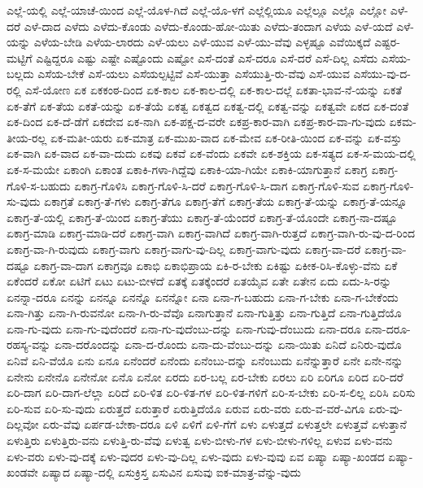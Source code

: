 {ಎಲ್ಲೆ-ಯಲ್ಲಿ
ಎಲ್ಲೆ-ಯಾಚೆ-ಯಿಂದ
ಎಲ್ಲೆ-ಯೊಳ-ಗಿದೆ
ಎಲ್ಲೆ-ಯೊ-ಳಗೆ
ಎಲ್ಲೆಲ್ಲಿಯೂ
ಎಲ್ಲೆಲ್ಲೂ
ಎಲ್ಲೊ
ಎಲ್ಲೋ
ಎಳೆ-ದರೆ
ಎಳೆ-ದಾದ
ಎಳೆದು
ಎಳೆದು-ಕೊಂಡು
ಎಳೆದು-ಕೊಂಡು-ಹೋ-ಯಿತು
ಎಳೆದು-ತಂದಾಗ
ಎಳೆಯ
ಎಳೆ-ಯದೆ
ಎಳೆ-ಯನ್ನು
ಎಳೆಯ-ಬೇಡಿ
ಎಳೆಯ-ಲಾರದು
ಎಳೆ-ಯಲು
ಎಳೆ-ಯುವ
ಎಳೆ-ಯು-ವೆವು
ಎಳ್ಳಷ್ಟೂ
ಎವೆಯಿಕ್ಕದೆ
ಎಷ್ಟರ-ಮಟ್ಟಿಗೆ
ಎಷ್ಟಿದ್ದರೂ
ಎಷ್ಟು
ಎಷ್ಟೇ
ಎಷ್ಟೊಂದು
ಎಷ್ಟೋ
ಎಸೆ-ದಂತೆ
ಎಸೆ-ದರೂ
ಎಸೆ-ದರೆ
ಎಸೆ-ದಿಲ್ಲ
ಎಸೆದು
ಎಸೆಯ-ಬಲ್ಲದು
ಎಸೆಯ-ಬೇಕೆ
ಎಸೆ-ಯಲು
ಎಸೆಯಲ್ಪಟ್ಟಿವೆ
ಎಸೆ-ಯುತ್ತಾ
ಎಸೆಯುತ್ತಿ-ರು-ವೆವು
ಎಸೆ-ಯುವ
ಎಸೆಯು-ವು-ದ-ರಲ್ಲಿ
ಎಸೆ-ಯೋಣ
ಏಕ
ಏಕಕಂಠ-ದಿಂದ
ಏಕ-ಕಾಲ
ಏಕ-ಕಾಲ-ದಲ್ಲಿ
ಏಕ-ಕಾಲ-ದಲ್ಲೆ
ಏಕತಾ-ಭಾವ-ನೆ-ಯನ್ನು
ಏಕತೆ
ಏಕ-ತೆಗೆ
ಏಕ-ತೆಯ
ಏಕತೆ-ಯನ್ನು
ಏಕ-ತೆಯೆ
ಏಕತ್ವ
ಏಕತ್ವದ
ಏಕತ್ವ-ದಲ್ಲಿ
ಏಕತ್ವ-ವನ್ನು
ಏಕತ್ವವೇ
ಏಕದ
ಏಕ-ದಂತೆ
ಏಕ-ದಿಂದ
ಏಕ-ದೆ-ಡೆಗೆ
ಏಕದೇವ
ಏಕ-ನಾಗಿ
ಏಕ-ಪಕ್ಷ-ದ-ವರೇ
ಏಕಪ್ರ-ಕಾರ-ವಾಗಿ
ಏಕಪ್ರ-ಕಾರ-ವಾ-ಗು-ವುದು
ಏಕಮ-ತೀಯ-ರಲ್ಲ
ಏಕ-ಮತೀ-ಯರು
ಏಕ-ಮಾತ್ರ
ಏಕ-ಮುಖ-ವಾದ
ಏಕ-ಮೇವ
ಏಕ-ರೀತಿ-ಯಿಂದ
ಏಕ-ವನ್ನು
ಏಕ-ವಸ್ತು
ಏಕ-ವಾಗಿ
ಏಕ-ವಾದ
ಏಕ-ವಾ-ದುದು
ಏಕವು
ಏಕವೆ
ಏಕ-ವೆಂದು
ಏಕವೇ
ಏಕ-ಶಕ್ತಿಯ
ಏಕ-ಸತ್ಯದ
ಏಕ-ಸ-ಮಯ-ದಲ್ಲಿ
ಏಕ-ಸ-ಮಯೇ
ಏಕಾಂಗಿ
ಏಕಾಂತ
ಏಕಾಕಿ-ಗಳಾ-ಗಿದ್ದೆವು
ಏಕಾಕಿ-ಯಾ-ಗಿಯೇ
ಏಕಾಕಿ-ಯಾಗುತ್ತಾನೆ
ಏಕಾಗ್ರ
ಏಕಾಗ್ರ-ಗೊಳಿ-ಸ-ಬಹುದು
ಏಕಾಗ್ರ-ಗೊಳಿಸಿ
ಏಕಾಗ್ರ-ಗೊಳಿ-ಸಿ-ದರೆ
ಏಕಾಗ್ರ-ಗೊಳಿ-ಸಿ-ದಾಗ
ಏಕಾಗ್ರ-ಗೊಳಿ-ಸುವ
ಏಕಾಗ್ರ-ಗೊಳಿ-ಸು-ವುದು
ಏಕಾಗ್ರತೆ
ಏಕಾಗ್ರ-ತೆ-ಗಳು
ಏಕಾಗ್ರ-ತೆಗೂ
ಏಕಾಗ್ರ-ತೆಗೆ
ಏಕಾಗ್ರ-ತೆಯ
ಏಕಾಗ್ರ-ತೆ-ಯನ್ನು
ಏಕಾಗ್ರ-ತೆ-ಯನ್ನೂ
ಏಕಾಗ್ರ-ತೆ-ಯಲ್ಲಿ
ಏಕಾಗ್ರ-ತೆ-ಯಿಂದ
ಏಕಾಗ್ರ-ತೆಯು
ಏಕಾಗ್ರ-ತೆ-ಯೆಂದರೆ
ಏಕಾಗ್ರ-ತೆ-ಯೊಂದೇ
ಏಕಾಗ್ರ-ನಾ-ದಷ್ಟೂ
ಏಕಾಗ್ರ-ಮಾಡಿ
ಏಕಾಗ್ರ-ಮಾಡಿ-ದರೆ
ಏಕಾಗ್ರ-ವಾಗಿ
ಏಕಾಗ್ರ-ವಾಗಿದೆ
ಏಕಾಗ್ರ-ವಾಗಿ-ರುತ್ತದೆ
ಏಕಾಗ್ರ-ವಾಗಿ-ರು-ವು-ದ-ರಿಂದ
ಏಕಾಗ್ರ-ವಾ-ಗಿ-ರುವುದು
ಏಕಾಗ್ರ-ವಾಗು
ಏಕಾಗ್ರ-ವಾಗು-ವು-ದಿಲ್ಲ
ಏಕಾಗ್ರ-ವಾಗು-ವುದು
ಏಕಾಗ್ರ-ವಾ-ದರೆ
ಏಕಾಗ್ರ-ವಾ-ದಷ್ಟೂ
ಏಕಾಗ್ರ-ವಾ-ದಾಗ
ಏಕಾಗ್ರವೂ
ಏಕಾಭಿ
ಏಕಾಭಿಪ್ರಾಯ
ಏಕಿ-ರ-ಬೇಕು
ಏಕಿಷ್ಟು
ಏಕೀಕ-ರಿಸಿ-ಕೊಳ್ಳು-ವೆನು
ಏಕೆ
ಏಕೆಂದರೆ
ಏಕೋ
ಏಟಿಗೆ
ಏಟು
ಏಟು-ಬೀಳದೆ
ಏತಕ್ಕೆ
ಏತಕ್ಕೆಂದರೆ
ಏತಯೈವ
ಏತೇ
ಏತೇನ
ಏದು
ಏದು-ಸಿ-ರನ್ನು
ಏನನ್ನಾ-ದರೂ
ಏನನ್ನು
ಏನನ್ನೂ
ಏನನ್ನೊ
ಏನನ್ನೋ
ಏನಾ
ಏನಾ-ಗ-ಬಹುದು
ಏನಾ-ಗ-ಬೇಕು
ಏನಾ-ಗ-ಬೇಕೆಂದು
ಏನಾ-ಗಿತ್ತು
ಏನಾ-ಗಿ-ರುವನೋ
ಏನಾ-ಗಿ-ರು-ವೆವೊ
ಏನಾಗುತ್ತಾನೆ
ಏನಾ-ಗುತ್ತಿತ್ತು
ಏನಾ-ಗುತ್ತಿದೆ
ಏನಾ-ಗುತ್ತಿದೆಯೊ
ಏನಾ-ಗು-ವುದು
ಏನಾ-ಗು-ವುದೆಂದರೆ
ಏನಾ-ಗು-ವುದೆಂಬು-ದನ್ನು
ಏನಾ-ಗುವು-ದೆಂಬುದು
ಏನಾ-ದರೂ
ಏನಾ-ದರೂ-ರಹಸ್ಯ-ವನ್ನು
ಏನಾ-ದರೊಂದನ್ನು
ಏನಾ-ದ-ರೊಂದು
ಏನಾ-ದು-ವೆಂಬು-ದನ್ನು
ಏನಾ-ಯಿತು
ಏನಿದೆ
ಏನಿರು-ವುದೊ
ಏನಿವೆ
ಏನಿ-ವೆಯೊ
ಏನು
ಏನೂ
ಏನೆಂದರೆ
ಏನೆಂದು
ಏನೆಂಬು-ದನ್ನು
ಏನೆಂಬುದು
ಏನೆನ್ನುತ್ತಾರೆ
ಏನೇ
ಏನೇ-ನನ್ನು
ಏನೇನು
ಏನೇನೊ
ಏನೇನೋ
ಏನೊ
ಏನೋ
ಏರದು
ಏರ-ಬಲ್ಲ
ಏರ-ಬೇಕು
ಏರಲು
ಏರಿ
ಏರಿಗೂ
ಏರಿದ
ಏರಿ-ದರೆ
ಏರಿ-ದಾಗ
ಏರಿ-ದಾಗ-ಲೆಲ್ಲಾ
ಏರಿದೆ
ಏರಿ-ಳಿತ
ಏರಿ-ಳಿತ-ಗಳ
ಏರಿ-ಳಿತ-ಗಳಿಗೆ
ಏರಿ-ಸ-ಬೇಕು
ಏರಿ-ಸ-ಲಿಲ್ಲ
ಏರಿಸಿ
ಏರಿಸು
ಏರಿ-ಸುವ
ಏರಿ-ಸು-ವುದು
ಏರುತ್ತದೆ
ಏರುತ್ತಾರೆ
ಏರುತ್ತಿದೆಯೊ
ಏರುವ
ಏರು-ವರು
ಏರು-ವ-ವರೆ-ವಿಗೂ
ಏರು-ವು-ದಿಲ್ಲವೋ
ಏರು-ವೆವು
ಏರ್ಪಡ-ಬೇಕಾ-ದರೂ
ಏಳಿ
ಏಳಿಗೆ
ಏಳಿ-ಗೆಗೆ
ಏಳು
ಏಳುತ್ತದೆ
ಏಳುತ್ತಲೇ
ಏಳುತ್ತವೆ
ಏಳುತ್ತಾನೆ
ಏಳುತ್ತಿರು
ಏಳುತ್ತಿರು-ವನು
ಏಳುತ್ತಿ-ರು-ವೆವು
ಏಳುತ್ವ
ಏಳು-ಬೀಳು-ಗಳ
ಏಳು-ಬೀಳು-ಗಳಿಲ್ಲ
ಏಳುವ
ಏಳು-ವನು
ಏಳು-ವರು
ಏಳು-ವು-ದಕ್ಕೆ
ಏಳು-ವುದರ
ಏಳು-ವು-ದಿಲ್ಲ
ಏಳು-ವುದು
ಏಳು-ವುವು
ಏವ
ಏಷ್ಯಾ
ಏಷ್ಯಾ-ಖಂಡದ
ಏಷ್ಯಾ-ಖಂಡವೇ
ಏಷ್ಯಾದ
ಏಷ್ಯಾ-ದಲ್ಲಿ
ಏಸುಕ್ರಿಸ್ತ
ಏಸುವಿನ
ಏಸುವು
ಐಕ-ಮಾತ್ರ-ವೆನ್ನು-ವುದು
}
